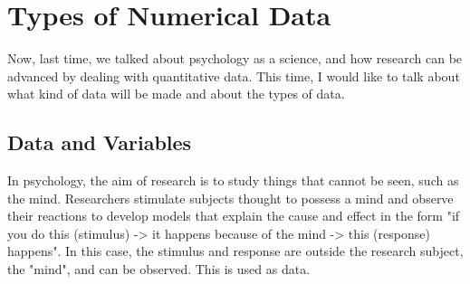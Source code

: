 \documentclass{ltjsbook}
\begin{document}
\chapter{Types of Numerical Data}
\label{m02_Numbers}
Now, last time, we talked about psychology as a science, and how research can be advanced by dealing with quantitative data. This time, I would like to talk about what kind of data will be made and about the types of data.
\section{Data and Variables}
In psychology, the aim of research is to study things that cannot be seen, such as the mind. Researchers stimulate subjects thought to possess a mind and observe their reactions to develop models that explain the cause and effect in the form "if you do this (stimulus) -> it happens because of the mind -> this (response) happens". In this case, the stimulus and response are outside the research subject, the "mind", and can be observed. This is used as data.
\end{document}
